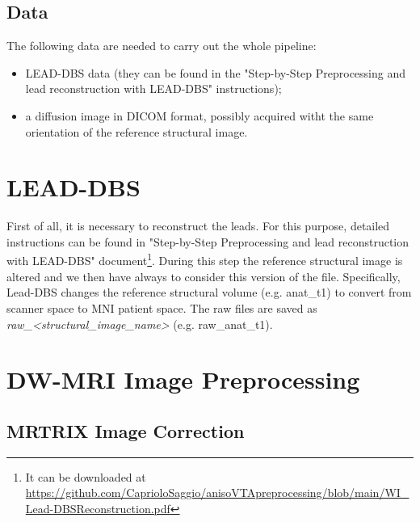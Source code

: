 \documentclass[a4paper,11pt]{article}
\begin{document}
\subsection{Data}

The following data are needed to carry out the whole pipeline:
\begin{itemize}
\item LEAD-DBS data (they can be found in the "Step-by-Step Preprocessing and lead reconstruction with LEAD-DBS" instructions);
\item a diffusion image in DICOM format, possibly acquired witht the same orientation of the reference structural image.
\end{itemize}

\section{LEAD-DBS}

First of all, it is necessary to reconstruct the leads. For this purpose, detailed instructions can be found in "Step-by-Step Preprocessing and lead reconstruction with LEAD-DBS" document\footnote{It can be downloaded at \url{https://github.com/CaprioloSaggio/anisoVTApreprocessing/blob/main/WI_Lead-DBSReconstruction.pdf}}. During this step the reference structural image is altered and we then have always to consider this version of the file. Specifically, Lead-DBS changes the reference structural volume (e.g. anat\_t1) to convert from scanner space to MNI patient space. The raw files are saved as \emph{raw\_<structural\_image\_name>} (e.g. raw\_anat\_t1).

\section{DW-MRI Image Preprocessing}

\subsection{MRTRIX Image Correction}
\end{document}
